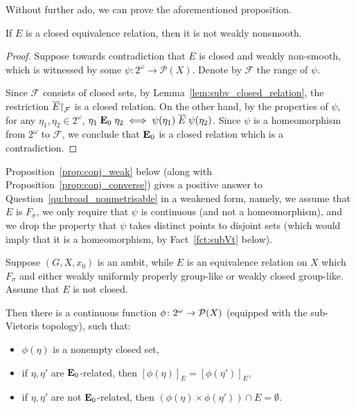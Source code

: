 	Without further ado, we can prove the aforementioned proposition.
	\begin{prop}
		\label{prop:conj_converse}
		If $E$ is a closed equivalence relation, then it is not weakly nonsmooth.
	\end{prop}
	\begin{proof}
		Suppose towards contradiction that $E$ is closed and weakly non-smooth, which is witnessed by some $\psi\colon 2^\omega\to \mathcal P(X)$. Denote by $\mathcal F$ the range of $\psi$.
		
		Since $\mathcal F$ consists of closed sets, by Lemma~\ref{lem:subv_closed_relation}, the restriction $\overline{E}\mathord{\upharpoonright}_{\mathcal F}$ is a closed relation. On the other hand, by the properties of $\psi$, for any $\eta_1,\eta_2 \in2^{\omega}$, $\eta_1 \mathrel{ { {\mathbf E}_0 } } \eta_2 \iff \psi(\eta_1) \mathrel{\overline{E}} \psi(\eta_2)$. Since $\psi$ is a homeomorphism from $2^{\omega}$ to ${\mathcal F}$, we conclude that $\mathrel{ { {\mathbf E}_0 } }$ is a closed relation which is a contradiction.
	\end{proof}
	
	Proposition~\ref{prop:conj_weak} below (along with Proposition~\ref{prop:conj_converse}) gives a positive answer to Question~\ref{qu:broad_nonmetrisable} in a weakened form, namely, we assume that $E$ is $F_\sigma$, we only require that $\psi$ is continuous (and not a homeomorphism), and we drop the property that $\psi$ takes distinct points to disjoint sets (which would imply that it is a homeomorphism, by Fact~\ref{fct:subVt} below).
	
	\begin{prop}
		\label{prop:conj_weak}
		Suppose $(G,X,x_0)$ is an ambit, while $E$ is an equivalence relation on $X$ which $F_\sigma$ and either weakly uniformly properly group-like or weakly closed group-like. Assume that $E$ is not closed.
		
		Then there is a continuous function $\phi\colon 2^\omega\to {\mathcal P}(X)$ (equipped with the sub-Vietoris topology), such that:
		\begin{itemize}
			\item
			$\phi(\eta)$ is a nonempty closed set,
			\item
			if $\eta,\eta'$ are $\mathrel{ { {\mathbf E}_0 } }$-related, then $[\phi(\eta)]_{E}=[\phi(\eta')]_{E}$,
			\item
			if $\eta,\eta'$ are not $\mathrel{ { {\mathbf E}_0 } }$-related, then $(\phi(\eta)\times \phi(\eta'))\cap E=\emptyset$.
		\end{itemize}
	\end{prop}
	
